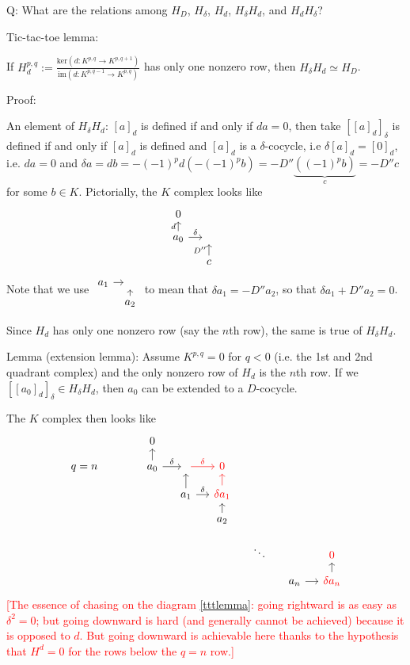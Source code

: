 \documentclass{article}
\theoremstyle{mystyle}
\theoremstyle{remark}
\numberwithin{equation}{section}
\begin{document}
Q: What are the relations among $H_D$, $H_\delta$, $H_d$, $H_\delta H_d$, and $H_dH_\delta$?

Tic-tac-toe lemma:

If $H_d^{p,q}:= \frac{\mathrm{ker}(d\colon K^{p,q}\rightarrow K^{p,q+1})}{\mathrm{im}(d\colon K^{p,q-1}\rightarrow K^{p,q})}$ has only one nonzero row, then $H_\delta H_d \simeq H_D$. 

Proof:

An element of $H_\delta H_d$: $[a]_d$ is defined if and only if $da=0$, then take $[[a]_d]_\delta$ is defined if and only if $[a]_d$ is defined and $[a]_d$ is a $\delta$-cocycle, i.e $\delta[a]_d=[0]_d$, i.e. $da=0$ and $\delta a = db = -(-1)^pd(-(-1)^pb) = -D''\underbrace{((-1)^pb)}_{c} = -D''c$ for some $b \in K$. Pictorially, the $K$ complex looks like
$$
\begin{tikzcd}[row sep = small, column sep = small] 
0&&&\\
a_0\ar[r,"\delta"] \ar[u,"d"] &~&\\
&\ar[u,"D''"] c &
\end{tikzcd}
$$
Note that we use $\begin{tikzcd}[row sep = tiny, column sep = tiny] a_1\ar[r]&~\\&a_2 \ar[u]\end{tikzcd}$ to mean that $\delta a_1 = -D''a_2$, so that $\delta a_1 + D''a_2=0$. 

Since $H_d$ has only one nonzero row (say the $n$th row), the same is true of $H_\delta H_d$. 

Lemma (extension lemma): Assume $K^{p,q}=0$ for $q<0$ (i.e. the 1st and 2nd quadrant complex) and the only nonzero row of $H_d$ is the $n$th row. If we $[[a_0]_d]_\delta \in H_\delta H_d$, 
then $a_0$ can be extended to a $D$-cocycle.

The $K$ complex then looks like
\begin{equation}\label{tttlemma}
\begin{tikzcd}[column sep = small, row sep = small]&&&0&&&&&\\
q=n&&&a_0 \ar[u]\ar[r,"\delta"] &\ar[r,red,"\delta"] &\textcolor{red}{0}&&&\\&&&&a_1 \ar[u] \ar[r,"\delta"]&\textcolor{red}{\delta a_1} \ar[u,red]{d}&&&\\&&&&&a_2 \ar[u]&&&\\
&&&&&&\ddots& & \textcolor{red}{0}\\
&&&&&&&a_n\ar[r]&\textcolor{red}{\delta a_n} \ar[u]
\end{tikzcd}
\end{equation}
\textcolor{red}{[The essence of chasing on the diagram \eqref{tttlemma}: going rightward is as easy as $\delta^2=0$; but going downward is hard (and generally cannot be achieved)  because it is opposed to $d$. But going downward is achievable here thanks to the hypothesis that $H^d=0$ for the rows below the $q=n$ row.]}
\end{document}
